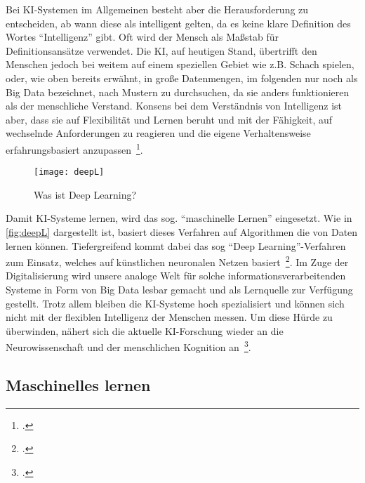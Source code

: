 Bei \ac{KI}-Systemen im Allgemeinen besteht aber die Herausforderung zu entscheiden, ab wann diese als intelligent gelten, da es keine klare Definition des Wortes \enquote{Intelligenz} gibt.
Oft wird der Mensch als Maßstab für Definitionsansätze verwendet. Die \ac{KI}, auf heutigen Stand, übertrifft den Menschen jedoch bei weitem auf einem speziellen Gebiet wie z.B. Schach spielen,
oder, wie oben bereits erwähnt, in große Datenmengen, im folgenden nur noch als Big Data bezeichnet, nach Mustern zu durchsuchen, da sie anders funktionieren als der menschliche Verstand.
Konsens bei dem Verständnis von Intelligenz ist aber, dass sie auf Flexibilität und Lernen beruht und mit der Fähigkeit, auf wechselnde Anforderungen zu reagieren und die eigene 
Verhaltensweise erfahrungsbasiert anzupassen~\footcite[\vglf][]{Lenzen.2020}. 

\begin{figure}[H]
    \centering
    \captionsetup{justification=centering}
    \texttt{[image: deepL]}
    \caption[Was ist Deep Learning?]{Was ist Deep Learning?\footnotemark}
    \label{fig:deepL}
\end{figure}

Damit \ac{KI}-Systeme lernen, wird das sog. \enquote{maschinelle Lernen} eingesetzt. Wie in \autoref{fig:deepL} dargestellt ist, basiert dieses Verfahren auf Algorithmen die von Daten lernen können. Tiefergreifend kommt dabei das 
sog \enquote{Deep Learning}-Verfahren zum Einsatz, welches auf künstlichen neuronalen Netzen basiert~\footcite[\vglf][]{Lenzen.2020}.
Im Zuge der Digitalisierung wird unsere analoge Welt für solche informationsverarbeitenden Systeme in Form von Big Data lesbar gemacht und als Lernquelle zur Verfügung gestellt.
Trotz allem bleiben die \ac{KI}-Systeme hoch spezialisiert und können sich nicht mit der flexiblen Intelligenz der Menschen messen. Um diese Hürde zu überwinden, nähert sich die 
aktuelle \ac{KI}-Forschung wieder an die Neurowissenschaft und der menschlichen Kognition an~\footcite[\vglf][]{Lenzen.2020}.

\subsection{Maschinelles lernen}

